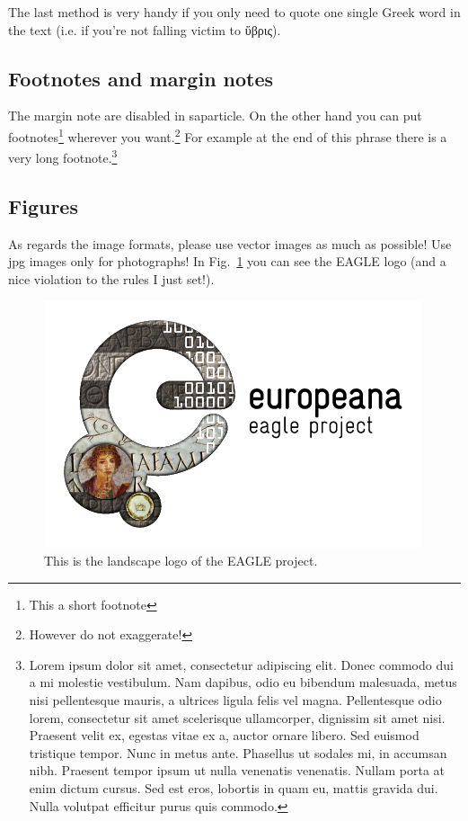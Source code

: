 \documentclass[amsthm,ebook]{saparticle}
\begin{document}
The last method is very handy if you only need to quote one single Greek word in the text (i.e. if you're not falling victim to \textgreek{ὕβρις}).

\subsection{Footnotes and margin notes}\label{sub:notes}

The margin note are disabled in \textsf{saparticle}. On the other hand you can put footnotes\footnote{This a short footnote} wherever you want.\footnote{However do not exaggerate!} For example at the end of this phrase there is a very long footnote.\footnote{Lorem ipsum dolor sit amet, consectetur adipiscing elit. Donec commodo dui a mi molestie vestibulum. Nam dapibus, odio eu bibendum malesuada, metus nisi pellentesque mauris, a ultrices ligula felis vel magna. Pellentesque odio lorem, consectetur sit amet scelerisque ullamcorper, dignissim sit amet nisi. Praesent velit ex, egestas vitae ex a, auctor ornare libero. Sed euismod tristique tempor.  Nunc in metus ante. Phasellus ut sodales mi, in accumsan nibh. Praesent tempor ipsum ut nulla venenatis venenatis. Nullam porta at enim dictum cursus. Sed est eros, lobortis in quam eu, mattis gravida dui. Nulla volutpat efficitur purus quis commodo.}

\subsection{Figures}

As regards the image formats, please use vector images as much as possible! Use jpg images only for photographs! In Fig.~\ref{fig:eagle-logo} you can see the EAGLE logo (and a nice violation to the rules I just set!).

\begin{figure}[!bp]
\centering
\includegraphics[scale=0.50]{img/egl-logo.png}
\caption{This is the landscape logo of the EAGLE project.}
\label{fig:eagle-logo}
\end{figure}
\end{document}
